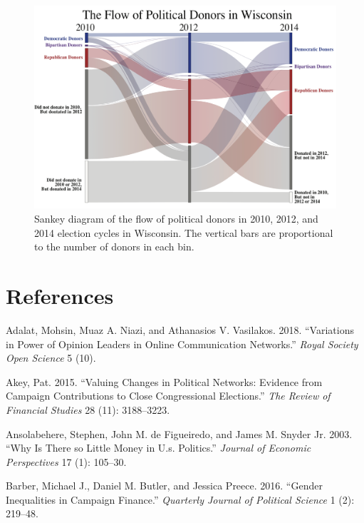 \documentclass[12pt,]{article}
\begin{document}
\begin{figure}
\centering
\includegraphics{../figures/fig2.png}
\caption{Sankey diagram of the flow of political donors in 2010, 2012,
and 2014 election cycles in Wisconsin. The vertical bars are
proportional to the number of donors in each bin.}
\end{figure}

\hypertarget{references}{%
\section*{References}\label{references}}

\hypertarget{refs}{}
\leavevmode\hypertarget{ref-adalat2018}{}%
Adalat, Mohsin, Muaz A. Niazi, and Athanasios V. Vasilakos. 2018.
``Variations in Power of Opinion Leaders in Online Communication
Networks.'' \emph{Royal Society Open Science} 5 (10).

\leavevmode\hypertarget{ref-akey2015}{}%
Akey, Pat. 2015. ``Valuing Changes in Political Networks: Evidence from
Campaign Contributions to Close Congressional Elections.'' \emph{The
Review of Financial Studies} 28 (11): 3188--3223.

\leavevmode\hypertarget{ref-ansolabehere2003}{}%
Ansolabehere, Stephen, John M. de Figueiredo, and James M. Snyder Jr.
2003. ``Why Is There so Little Money in U.s. Politics.'' \emph{Journal
of Economic Perspectives} 17 (1): 105--30.

\leavevmode\hypertarget{ref-barber2016b}{}%
Barber, Michael J., Daniel M. Butler, and Jessica Preece. 2016. ``Gender
Inequalities in Campaign Finance.'' \emph{Quarterly Journal of Political
Science} 1 (2): 219--48.
\end{document}
